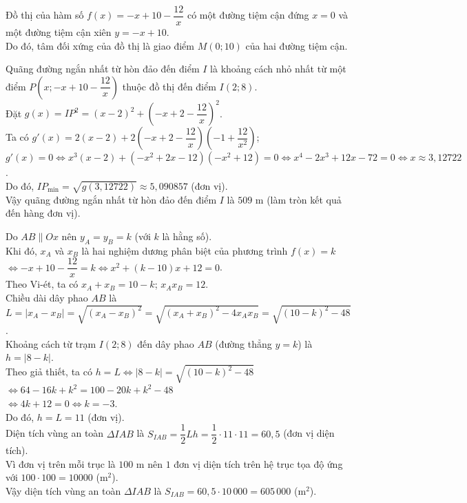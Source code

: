 \begin{ex}
{\begin{itemchoice}
			\itemch Đồ thị của hàm số $f(x)=-x+10-\dfrac{12}{x}$ có một đường tiệm cận đứng $x=0$ và một đường tiệm cận xiên $y=-x+10$.\\
			Do đó, tâm đối xứng của đồ thị là giao điểm $M(0; 10)$ của hai đường tiệm cận.
			
			\itemch Quãng đường ngắn nhất từ hòn đảo đến điểm $I$ là khoảng cách nhỏ nhất từ một điểm $P\left(x; -x+10-\dfrac{12}{x}\right)$ thuộc đồ thị đến điểm $I(2; 8)$.\\
			Đặt $g(x)=IP^2=(x-2)^2+\left(-x+2-\dfrac{12}{x}\right)^2$.\\
			Ta có $g'(x)=2(x-2)+2\left(-x+2-\dfrac{12}{x}\right)\left(-1+\dfrac{12}{x^2}\right)$;\\
			$g'(x)=0 \Leftrightarrow x^3(x-2)+(-x^2+2x-12)(-x^2+12)=0 \Leftrightarrow x^4-2x^3+12x-72=0 \Leftrightarrow x \approx 3{,}12722$.\\
			Do đó, $IP_{\min} = \sqrt{g(3{,}12722)} \approx 5{,}090857$ (đơn vị).\\
			Vậy quãng đường ngắn nhất từ hòn đảo đến điểm $I$ là $509$ m (làm tròn kết quả đến hàng đơn vị).
			
			\itemch Do $AB \parallel Ox$ nên $y_A=y_B=k$ (với $k$ là hằng số).\\
			Khi đó, $x_A$ và $x_B$ là hai nghiệm dương phân biệt của phương trình $f(x)=k$\\
			$\Leftrightarrow -x+10-\dfrac{12}{x}=k \Leftrightarrow x^2+(k-10)x+12=0$.\\
			Theo Vi-ét, ta có $x_A+x_B=10-k$; $x_A x_B=12$.\\
			Chiều dài dây phao $AB$ là\\
			$L=|x_A-x_B|=\sqrt{(x_A-x_B)^2}=\sqrt{(x_A+x_B)^2-4x_A x_B}=\sqrt{(10-k)^2-48}$.\\
			Khoảng cách từ trạm $I(2; 8)$ đến dây phao $AB$ (đường thẳng $y=k$) là $h=|8-k|$.\\
			Theo giả thiết, ta có $h=L \Leftrightarrow |8-k|=\sqrt{(10-k)^2-48}$\\
			$\Leftrightarrow 64-16k+k^2=100-20k+k^2-48$\\
			$\Leftrightarrow 4k+12=0 \Leftrightarrow k=-3$.\\
			Do đó, $h=L=11$ (đơn vị).\\
			Diện tích vùng an toàn $\Delta IAB$ là $S_{IAB}=\dfrac{1}{2}Lh=\dfrac{1}{2} \cdot 11 \cdot 11=60{,}5$ (đơn vị diện tích).\\
			Vì đơn vị trên mỗi trục là $100$ m nên $1$ đơn vị diện tích trên hệ trục tọa độ ứng với $100 \cdot 100=10000$ (m$^2$).\\
			Vậy diện tích vùng an toàn $\Delta IAB$ là $S_{IAB}=60{,}5 \cdot 10\,000=605\,000$ (m$^2$).
		\end{itemchoice}
	}
\end{ex}

